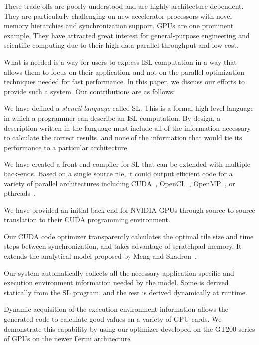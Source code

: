 \documentclass[preprint,nocopyrightspace]{styles/sigplanconf}
\begin{document}
These trade-offs are poorly understood and are highly architecture dependent.  
They are particularly challenging on new accelerator processors with novel 
memory hierarchies and synchronization support.
GPUs are one prominent example.  
They have attracted great interest for general-purpose engineering and scientific
computing due to their high data-parallel throughput and low cost.

What is needed is a way for users to express ISL computation in a
way that allows them to focus on their application, and not on the parallel
optimization techniques needed for fast performance.  In this paper, we discuss
our efforts to provide such a system.  Our contributions are as follows:

\begin{itemize*}
\item We have defined a {\em stencil language} called SL.
  This is a formal high-level language in which a programmer can describe 
  an ISL computation.  
  By design, a description written in the language must
  include all of the information necessary to calculate the correct
  results, and none of the information that would tie its performance
  to a particular architecture.
\item We have created a front-end compiler for SL that can be extended with
  multiple back-ends.  Based on a single source file, it could output
  efficient code for a variety of parallel architectures including
  CUDA~\cite{CUDA1, CUDA2}, OpenCL~\cite{OpenCL}, OpenMP~\cite{OpenMP}, 
  or pthreads~\cite{pthreads}.
\item We have provided an initial back-end for NVIDIA GPUs through 
  source-to-source translation to their CUDA programming environment.
\item
  Our CUDA code optimizer transparently calculates the optimal tile size and 
  time steps between synchronization, and takes advantage of scratchpad memory.
  It extends the analytical model proposed by Meng and Skadron~\cite{meng}.
\item
  Our system automatically collects all the necessary application specific 
  and execution environment information needed by the model.  
  Some is derived statically from the SL program, and the rest is derived dynamically at runtime.
\item Dynamic acquisition of the execution environment information 
  allows the generated code to calculate good values on a variety 
  of GPU cards.
  We demonstrate this capability by using our optimizer developed on the 
  GT200 series of GPUs on the newer Fermi architecture.
\end{itemize*}
\end{document}
